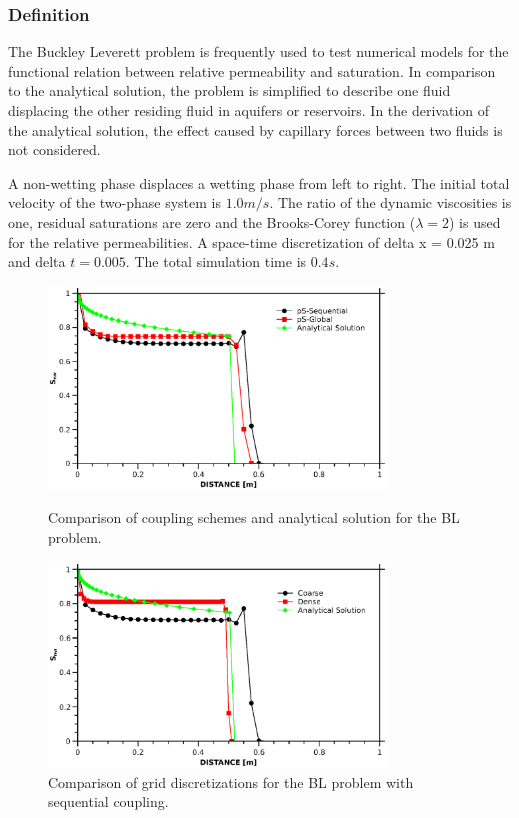 \subsubsection*{Definition}
The Buckley Leverett problem is frequently used to test numerical models for the functional relation between relative permeability and saturation. In comparison to the analytical solution, the problem is simplified to describe one fluid displacing the other residing fluid in aquifers or reservoirs. In the derivation of the analytical solution, the effect caused by capillary forces between two fluids is not considered.

A non-wetting phase displaces a wetting phase from left to right. The initial total velocity of the two-phase system is $1.0 m/s$. The ratio of the dynamic viscosities is one, residual saturations are zero and the Brooks-Corey function ($\lambda = 2$) is used for the relative permeabilities. A space-time discretization of delta x = 0.025 m and delta $t = 0.005$. The total simulation time is $0.4 s$.

\begin{figure}[!tbh]
\begin{center}
\includegraphics[width=0.8\textwidth]{chapter_13/figures/fig_13_1_5}
\end{center}
\caption{Comparison of coupling schemes and analytical solution for the BL problem.}
\label{blg:comparison}
\begin{center}
\includegraphics[width=0.8\textwidth]{chapter_13/figures/fig_13_1_6}
\end{center}
\caption{Comparison of grid discretizations for the BL problem with sequential coupling.}
\label{bls:comparison}
\end{figure}

